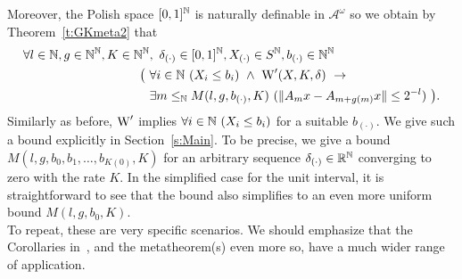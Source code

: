 Moreover, the Polish space $[0,1]^{\mathbb{N}}$ is naturally definable in $\mathcal{A}^\omega$ so we obtain
by Theorem~\ref{t:GKmeta2} that
\begin{align*}
\forall l\in\NN,g\in\NN^\NN,K\in\NN^\NN&,\ \delta_{(\cdot)}\in[0,1]^\NN, X_{(\cdot)}\in S^\NN, b_{(\cdot)}\in\NN^\NN\\ 
  \big(\ &\forall i\in\NN\ ( X_i\leq b_i)\ \wedge\ \TAN'(X,K,\delta)\ \rightarrow \\
	      &\exists m\leq_\NN M(l,g,b_{(\cdot)},K)\ ( \|A_mx-A_{m+g(m)}x\|\leq 2^{-l}) \ \big).
\end{align*}
Similarly as before, $\operatorname{W}'$ implies $\forall i\in\mathbb{N}\ ( X_i\leq b_i)$ for a suitable $b_{(\cdot)}$.
We give such a bound explicitly in Section~\ref{s:Main}. To be precise,
we give a bound $M(l,g, b_0, b_1, \ldots, b_{K(0)},K)$ for 
an arbitrary sequence $\delta_{(\cdot)}\in\mathbb{R}^{\mathbb{N}}$ converging to zero with the rate $K$. In the simplified case for 
the unit interval, it is straightforward to see that the bound also
simplifies to an even more uniform bound $M(l,g,b_0,K)$.\\
To repeat, these are very specific scenarios. We should emphasize that the 
Corollaries in~\cite{GK08}, and 
the metatheorem(s) even more so, have a much wider range of application.